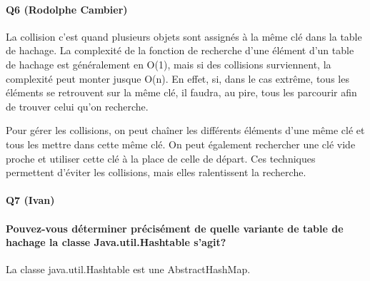 \documentclass[a4paper]{article}
\begin{document}
\paragraph{Q6 (Rodolphe Cambier)}
La collision c'est quand plusieurs objets sont assignés à la même clé dans la table de hachage. La complexité de la fonction de recherche d'une élément d'un table de hachage est généralement en O(1), mais si des collisions surviennent, la complexité peut monter jusque O(n). En effet, si, dans le cas extrême, tous les éléments se retrouvent sur la même clé, il faudra, au pire, tous les parcourir afin de trouver celui qu'on recherche. 

Pour gérer les collisions, on peut chaîner les différents éléments d'une même clé et tous les mettre dans cette même clé.
On peut également rechercher une clé vide proche et utiliser cette clé à la place de celle de départ. Ces techniques permettent d'éviter les collisions, mais elles ralentissent la recherche.

\paragraph{Q7 (Ivan)}

\paragraph*{Pouvez-vous déterminer précisément de quelle variante de table de hachage la classe Java.util.Hashtable s'agit?}

La classe java.util.Hashtable est une AbstractHashMap. 
\end{document}
